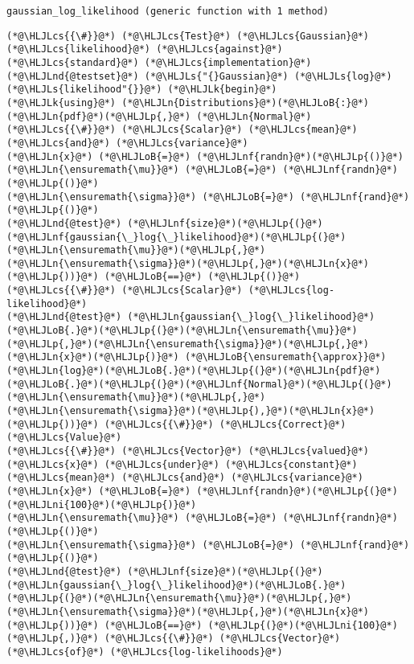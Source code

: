 \documentclass[12pt,a4paper]{article}
\newcommand{\HLJLk}[1]{\textcolor[RGB]{148,91,176}{\textbf{#1}}}
\newcommand{\HLJLn}[1]{#1}
\newcommand{\HLJLnd}[1]{\textcolor[RGB]{214,102,97}{#1}}
\newcommand{\HLJLnf}[1]{\textcolor[RGB]{66,102,213}{#1}}
\newcommand{\HLJLs}[1]{\textcolor[RGB]{201,61,57}{#1}}
\newcommand{\HLJLni}[1]{\textcolor[RGB]{59,151,46}{#1}}
\newcommand{\HLJLoB}[1]{\textcolor[RGB]{102,102,102}{\textbf{#1}}}
\newcommand{\HLJLp}[1]{#1}
\newcommand{\HLJLcs}[1]{\textcolor[RGB]{153,153,119}{\textit{#1}}}
\begin{document}
\begin{lstlisting}
gaussian_log_likelihood (generic function with 1 method)
\end{lstlisting}


\begin{lstlisting}
(*@\HLJLcs{{\#}}@*) (*@\HLJLcs{Test}@*) (*@\HLJLcs{Gaussian}@*) (*@\HLJLcs{likelihood}@*) (*@\HLJLcs{against}@*) (*@\HLJLcs{standard}@*) (*@\HLJLcs{implementation}@*)
(*@\HLJLnd{@testset}@*) (*@\HLJLs{"{}Gaussian}@*) (*@\HLJLs{log}@*) (*@\HLJLs{likelihood"{}}@*) (*@\HLJLk{begin}@*)
(*@\HLJLk{using}@*) (*@\HLJLn{Distributions}@*)(*@\HLJLoB{:}@*) (*@\HLJLn{pdf}@*)(*@\HLJLp{,}@*) (*@\HLJLn{Normal}@*)
(*@\HLJLcs{{\#}}@*) (*@\HLJLcs{Scalar}@*) (*@\HLJLcs{mean}@*) (*@\HLJLcs{and}@*) (*@\HLJLcs{variance}@*)
(*@\HLJLn{x}@*) (*@\HLJLoB{=}@*) (*@\HLJLnf{randn}@*)(*@\HLJLp{()}@*)
(*@\HLJLn{\ensuremath{\mu}}@*) (*@\HLJLoB{=}@*) (*@\HLJLnf{randn}@*)(*@\HLJLp{()}@*)
(*@\HLJLn{\ensuremath{\sigma}}@*) (*@\HLJLoB{=}@*) (*@\HLJLnf{rand}@*)(*@\HLJLp{()}@*)
(*@\HLJLnd{@test}@*) (*@\HLJLnf{size}@*)(*@\HLJLp{(}@*)(*@\HLJLnf{gaussian{\_}log{\_}likelihood}@*)(*@\HLJLp{(}@*)(*@\HLJLn{\ensuremath{\mu}}@*)(*@\HLJLp{,}@*)(*@\HLJLn{\ensuremath{\sigma}}@*)(*@\HLJLp{,}@*)(*@\HLJLn{x}@*)(*@\HLJLp{))}@*) (*@\HLJLoB{==}@*) (*@\HLJLp{()}@*) (*@\HLJLcs{{\#}}@*) (*@\HLJLcs{Scalar}@*) (*@\HLJLcs{log-likelihood}@*)
(*@\HLJLnd{@test}@*) (*@\HLJLn{gaussian{\_}log{\_}likelihood}@*)(*@\HLJLoB{.}@*)(*@\HLJLp{(}@*)(*@\HLJLn{\ensuremath{\mu}}@*)(*@\HLJLp{,}@*)(*@\HLJLn{\ensuremath{\sigma}}@*)(*@\HLJLp{,}@*)(*@\HLJLn{x}@*)(*@\HLJLp{)}@*) (*@\HLJLoB{\ensuremath{\approx}}@*) (*@\HLJLn{log}@*)(*@\HLJLoB{.}@*)(*@\HLJLp{(}@*)(*@\HLJLn{pdf}@*)(*@\HLJLoB{.}@*)(*@\HLJLp{(}@*)(*@\HLJLnf{Normal}@*)(*@\HLJLp{(}@*)(*@\HLJLn{\ensuremath{\mu}}@*)(*@\HLJLp{,}@*)(*@\HLJLn{\ensuremath{\sigma}}@*)(*@\HLJLp{),}@*)(*@\HLJLn{x}@*)(*@\HLJLp{))}@*) (*@\HLJLcs{{\#}}@*) (*@\HLJLcs{Correct}@*) (*@\HLJLcs{Value}@*)
(*@\HLJLcs{{\#}}@*) (*@\HLJLcs{Vector}@*) (*@\HLJLcs{valued}@*) (*@\HLJLcs{x}@*) (*@\HLJLcs{under}@*) (*@\HLJLcs{constant}@*) (*@\HLJLcs{mean}@*) (*@\HLJLcs{and}@*) (*@\HLJLcs{variance}@*)
(*@\HLJLn{x}@*) (*@\HLJLoB{=}@*) (*@\HLJLnf{randn}@*)(*@\HLJLp{(}@*)(*@\HLJLni{100}@*)(*@\HLJLp{)}@*)
(*@\HLJLn{\ensuremath{\mu}}@*) (*@\HLJLoB{=}@*) (*@\HLJLnf{randn}@*)(*@\HLJLp{()}@*)
(*@\HLJLn{\ensuremath{\sigma}}@*) (*@\HLJLoB{=}@*) (*@\HLJLnf{rand}@*)(*@\HLJLp{()}@*)
(*@\HLJLnd{@test}@*) (*@\HLJLnf{size}@*)(*@\HLJLp{(}@*)(*@\HLJLn{gaussian{\_}log{\_}likelihood}@*)(*@\HLJLoB{.}@*)(*@\HLJLp{(}@*)(*@\HLJLn{\ensuremath{\mu}}@*)(*@\HLJLp{,}@*)(*@\HLJLn{\ensuremath{\sigma}}@*)(*@\HLJLp{,}@*)(*@\HLJLn{x}@*)(*@\HLJLp{))}@*) (*@\HLJLoB{==}@*) (*@\HLJLp{(}@*)(*@\HLJLni{100}@*)(*@\HLJLp{,)}@*) (*@\HLJLcs{{\#}}@*) (*@\HLJLcs{Vector}@*) (*@\HLJLcs{of}@*) (*@\HLJLcs{log-likelihoods}@*)

\end{lstlisting}
\end{document}
